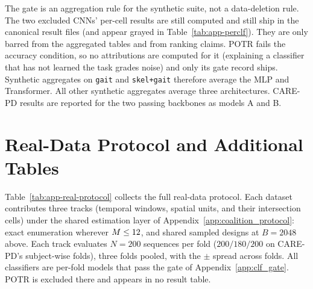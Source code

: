 The gate is an aggregation rule for the synthetic suite, not a
data-deletion rule.  The two excluded CNNs' per-cell results are still
computed and still ship in the canonical result files (and appear grayed in
Table~\ref{tab:app-perclf}).  They are only barred from the aggregated
tables and from ranking claims.  POTR fails the accuracy condition, so no
attributions are computed for it (explaining a classifier that has not
learned the task grades noise) and only its gate record ships.  Synthetic
aggregates on \texttt{gait} and \texttt{skel+gait} therefore average the
MLP and Transformer.  All other synthetic aggregates average three
architectures.  CARE-PD results are reported for the two passing backbones
as models A and B.

\section{Real-Data Protocol and Additional Tables}
\label{app:real_data_table}
\label{app:real_cells}

Table~\ref{tab:app-real-protocol} collects the full real-data protocol.
Each dataset contributes three tracks (temporal windows, spatial units, and
their intersection cells) under the shared estimation layer of
Appendix~\ref{app:coalition_protocol}: exact enumeration wherever
$M \leq 12$, and shared sampled designs at $B{=}2048$ above.  Each track
evaluates $N{=}200$ sequences per fold ($200/180/200$ on CARE-PD's
subject-wise folds), three folds pooled, with the $\pm$ spread across
folds.  All classifiers are per-fold models that pass the gate of
Appendix~\ref{app:clf_gate}.  POTR is excluded there and appears in no
result table.

